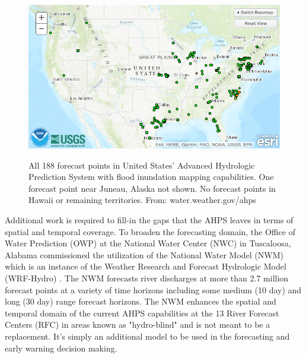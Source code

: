 \begin{figure}[h!]
\centering
\includegraphics[scale=2.0]{figs/ahps_fim_forecast_points_conus.jpg}
\label{fig:fim_ahps_points}
\caption{All 188 forecast points in United States' Advanced Hydrologic Prediction System with flood inundation mapping capabilities. One forecast point near Juneau, Alaska not shown. No forecast points in Hawaii or remaining territories. From: water.weather.gov/ahps}
\end{figure}

Additional work is required to fill-in the gaps that the AHPS leaves in terms of spatial and temporal coverage.
To broaden the forecasting domain, the Office of Water Prediction (OWP) at the National Water Center (NWC) in Tuscaloosa, Alabama commissioned the utilization of the National Water Model (NWM) which is an instance of the Weather Research and Forecast Hydrologic Model (WRF-Hydro) \cite{gochis2018wrf,cosgrove2019evolution}. 
The NWM forecasts river discharges at more than 2.7 million forecast points at a variety of time horizons including some medium (10 day) and long (30 day) range forecast horizons.
The NWM enhances the spatial and temporal domain of the current AHPS capabilities at the 13 River Forecast Centers (RFC) in areas known as "hydro-blind" and is not meant to be a replacement. 
It's simply an additional model to be used in the forecasting and early warning decision making.


